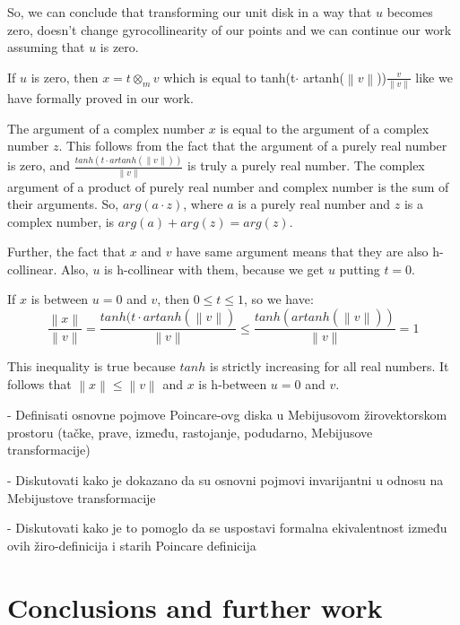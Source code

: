 \documentclass[a4paper]{article}
\theoremstyle{definition}
\newcommand{\norm}[1]{\left\lVert#1\right\rVert}
\begin{document}
So, we can conclude that transforming our unit disk in a way that $u$ becomes zero, doesn't change gyrocollinearity of our points and we can continue our work assuming that $u$ is zero.

If $u$ is zero, then $x=t\otimes_m v$ which is equal to tanh(t$\cdot$ artanh($\norm{v}$))$\frac{v}{\norm{v}}$ like we have formally proved in our work. 

The argument of a complex number $x$ is equal to the argument of a complex number $z$. This follows from the fact that the argument of a purely real number is zero, and $\frac{tanh(t\cdot artanh(\norm{v}))}{\norm{v}}$ is truly a purely real number. The complex argument of a product of purely real number and complex number is the sum of their arguments. So, $arg(a\cdot z)$, where $a$ is a purely real number and $z$ is a complex number, is $arg(a)+arg(z) = arg(z)$.  

Further, the fact that $x$ and $v$ have same argument means that they are also h-collinear. Also, $u$ is h-collinear with them, because we get $u$ putting $t=0$.

If $x$ is between $u=0$ and $v$, then $0\leq t \leq 1$, so we have:
$$\frac{\norm{x}}{\norm{v}} = \frac{tanh(t\cdot artanh(\norm{v})}{\norm{v}}\leq \frac{tanh(artanh(\norm{v}))}{\norm{v}}=1$$

This inequality is true because $tanh$ is strictly increasing for all real numbers. It follows that $\norm{x} \leq \norm{v}$ and $x$ is h-between $u=0$ and $v$.


- Definisati osnovne pojmove Poincare-ovg diska u Mebijusovom žirovektorskom prostoru (tačke, prave, između, rastojanje, podudarno, Mebijusove transformacije)

- Diskutovati kako je dokazano da su osnovni pojmovi invarijantni u odnosu na Mebijustove transformacije

- Diskutovati kako je to pomoglo da se uspostavi formalna ekivalentnost između ovih žiro-definicija i starih Poincare definicija

\section{Conclusions and further work}\label{sec:conclusions}


\end{document}
